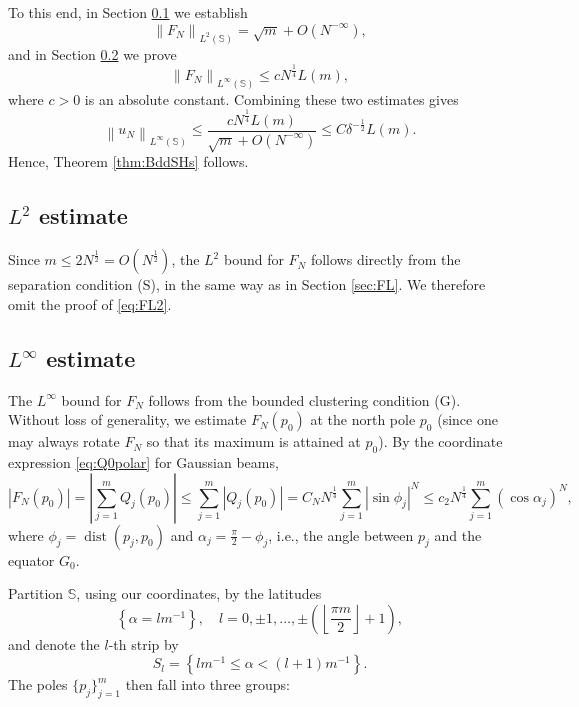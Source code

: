 \documentclass[12pt,reqno]{amsart}
\DeclareMathOperator{\dist}{dist}
\newcommand{\Sb}{\mathbb{S}}
\theoremstyle{plain}
\theoremstyle{definition}
\theoremstyle{remark}
\numberwithin{equation}{section}
\begin{document}
To this end, in Section \ref{sec:FL2} we establish
\begin{equation}\label{eq:FL2}
\left\|F_N\right\|_{L^2(\Sb)}=\sqrt m+O\left(N^{-\infty}\right),
\end{equation}
and in Section \ref{sec:FLinf} we prove
\begin{equation}\label{eq:FLinf}
\left\|F_N\right\|_{L^\infty(\Sb)}\le cN^\frac14L(m),
\end{equation}
where $c>0$ is an absolute constant. Combining these two estimates gives
$$\left\|u_N\right\|_{L^\infty(\Sb)}\le\frac{cN^\frac14L(m)}{\sqrt m+O\left(N^{-\infty}\right)}\le C\delta^{-\frac12}L(m).$$
Hence, Theorem \ref{thm:BddSHs} follows.

\subsection{$L^2$ estimate}\label{sec:FL2}
Since $m\le2N^\frac12=O(N^\frac12)$, the $L^2$ bound for $F_N$ follows directly from the separation condition (S), in the same way as in Section \ref{sec:FL}. We therefore omit the proof of \eqref{eq:FL2}.

\subsection{$L^\infty$ estimate}\label{sec:FLinf}
The $L^\infty$ bound for $F_N$ follows from the bounded clustering condition (G). Without loss of generality, we estimate $F_N(p_0)$ at the north pole $p_0$ (since one may always rotate $F_N$ so that its maximum is attained at $p_0$). By the coordinate expression \eqref{eq:Q0polar} for Gaussian beams,
$$\left|F_N\left(p_0\right)\right|=\left|\sum_{j=1}^mQ_j\left(p_0\right)\right|\le\sum_{j=1}^m\left|Q_j\left(p_0\right)\right|=C_NN^\frac14\sum_{j=1}^m\left|\sin\phi_j\right|^N\le c_2N^\frac14\sum_{j=1}^m\left(\cos\alpha_j\right)^N,$$
where $\phi_j=\dist(p_j,p_0)$ and $\alpha_j=\frac\pi2-\phi_j$, i.e., the angle between $p_j$ and the equator $G_0$. 

Partition $\Sb$, using our coordinates, by the latitudes
$$\left\{\alpha=lm^{-1}\right\},\quad l=0,\pm1,\dots,\pm\left(\left\lfloor\frac{\pi m}{2}\right\rfloor+1\right),$$
and denote the $l$-th strip by
$$S_l=\left\{lm^{-1}\le\alpha<(l+1)m^{-1}\right\}.$$
The poles $\{p_j\}_{j=1}^m$ then fall into three groups:
\end{document}
